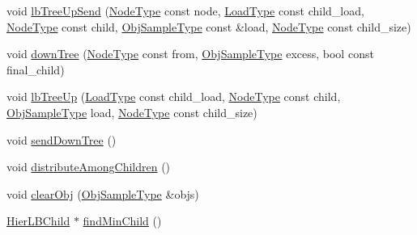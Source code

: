 \begin{DoxyCompactItemize}
\item 
void \hyperlink{structvt_1_1vrt_1_1collection_1_1lb_1_1_hierarchical_l_b_a8a9d35f8b4a8cd21461209136e64ad30}{lb\+Tree\+Up\+Send} (\hyperlink{namespacevt_a866da9d0efc19c0a1ce79e9e492f47e2}{Node\+Type} const node, \hyperlink{structvt_1_1vrt_1_1collection_1_1lb_1_1_base_l_b_a215e22b9f12678303f49615ae3be05cc}{Load\+Type} const child\+\_\+load, \hyperlink{namespacevt_a866da9d0efc19c0a1ce79e9e492f47e2}{Node\+Type} const child, \hyperlink{structvt_1_1vrt_1_1collection_1_1lb_1_1_load_sampler_base_l_b_a8d939a849ec0d6371c1c4d441ffb9b94}{Obj\+Sample\+Type} const \&load, \hyperlink{namespacevt_a866da9d0efc19c0a1ce79e9e492f47e2}{Node\+Type} const child\+\_\+size)
\item 
void \hyperlink{structvt_1_1vrt_1_1collection_1_1lb_1_1_hierarchical_l_b_a1e7609043ea2b9830c8dd08ee0c38aa1}{down\+Tree} (\hyperlink{namespacevt_a866da9d0efc19c0a1ce79e9e492f47e2}{Node\+Type} const from, \hyperlink{structvt_1_1vrt_1_1collection_1_1lb_1_1_load_sampler_base_l_b_a8d939a849ec0d6371c1c4d441ffb9b94}{Obj\+Sample\+Type} excess, bool const final\+\_\+child)
\item 
void \hyperlink{structvt_1_1vrt_1_1collection_1_1lb_1_1_hierarchical_l_b_a6f030d878c37c7dbca04f71304319930}{lb\+Tree\+Up} (\hyperlink{structvt_1_1vrt_1_1collection_1_1lb_1_1_base_l_b_a215e22b9f12678303f49615ae3be05cc}{Load\+Type} const child\+\_\+load, \hyperlink{namespacevt_a866da9d0efc19c0a1ce79e9e492f47e2}{Node\+Type} const child, \hyperlink{structvt_1_1vrt_1_1collection_1_1lb_1_1_load_sampler_base_l_b_a8d939a849ec0d6371c1c4d441ffb9b94}{Obj\+Sample\+Type} load, \hyperlink{namespacevt_a866da9d0efc19c0a1ce79e9e492f47e2}{Node\+Type} const child\+\_\+size)
\item 
void \hyperlink{structvt_1_1vrt_1_1collection_1_1lb_1_1_hierarchical_l_b_a1b7abcf40a8dfb63e9a2ee0842af413b}{send\+Down\+Tree} ()
\item 
void \hyperlink{structvt_1_1vrt_1_1collection_1_1lb_1_1_hierarchical_l_b_a15f26588a7e241d034ca627e463c1fdb}{distribute\+Among\+Children} ()
\item 
void \hyperlink{structvt_1_1vrt_1_1collection_1_1lb_1_1_hierarchical_l_b_a2190300d890419550a28b91e57ffacf6}{clear\+Obj} (\hyperlink{structvt_1_1vrt_1_1collection_1_1lb_1_1_load_sampler_base_l_b_a8d939a849ec0d6371c1c4d441ffb9b94}{Obj\+Sample\+Type} \&objs)
\item 
\hyperlink{structvt_1_1vrt_1_1collection_1_1lb_1_1_hier_l_b_child}{Hier\+L\+B\+Child} $\ast$ \hyperlink{structvt_1_1vrt_1_1collection_1_1lb_1_1_hierarchical_l_b_a4064a53d865ffe55ba520f0c75e9018d}{find\+Min\+Child} ()

\end{DoxyCompactItemize}
